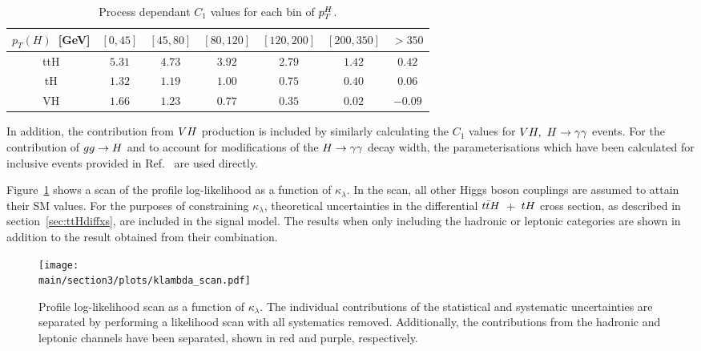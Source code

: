 \begin{table}[t!]
\begin{center}
\begin{tabular}{|c |c| c| c| c| c| c|}
\hline
   $p_T(H)$~[GeV] & $[0, 45]$  & $[45, 80]$ & $[80, 120]$ & $[120, 200]$ &  $[200, 350]$ &  $>350$ \\ 
\hline
\hline
ttH & $5.31$ & $4.73$ & $3.92$ & $2.79$ & $1.42$ & $0.42$ \\
\hline
tH & $1.32$ &$1.19$ & $1.00$ & $0.75$ & $0.40$ & $0.06$ \\
\hline 
VH & $1.66$ & $1.23$ & $0.77$ & $0.35$ & $0.02$ & $-0.09$ \\
\hline
\end{tabular}
 \caption{Process dependant $C_{1}$ values for each bin of $p_{T}^{H}$.}
\label{tab:ttHdiff_CMS_c1_values}
\end{center}
\end{table}


In addition, the contribution from $VH$ production is included by similarly calculating the $C_{1}$ values for $VH,~H\rightarrow\gamma\gamma$ events. For the contribution of $gg\rightarrow H$ and to account for modifications of the $H\rightarrow\gamma\gamma$ decay width, the parameterisations which have been calculated for inclusive events provided in Ref.~\cite{Degrassi:2016wml} are used directly.

Figure~\ref{fig:ttHdiff_CMS_klambda_scan} shows a scan of the profile log-likelihood as a function of $\kappa_{\lambda}$. In the scan, all other Higgs boson couplings are assumed to attain their SM values. For the purposes of constraining $\kappa_{\lambda}$, theoretical uncertainties in the differential $t\bar{t}H$~+~$tH$ cross section, as described in section~\ref{sec:ttHdiffxs}, are included in the signal model. The results when only including the hadronic or leptonic categories are shown in addition to the result obtained from their combination. 

\begin{figure}[htb!]
        \centering
        \texttt{[image: \\main/section3/plots/klambda\_scan.pdf]}
        \caption{Profile log-likelihood scan as a function of $\kappa_\lambda$. The individual contributions of the statistical and systematic uncertainties are separated by performing a likelihood scan with all systematics removed. Additionally, the contributions from the hadronic and leptonic channels have been separated, shown in red and purple, respectively.}
        \label{fig:ttHdiff_CMS_klambda_scan}
\end{figure}


